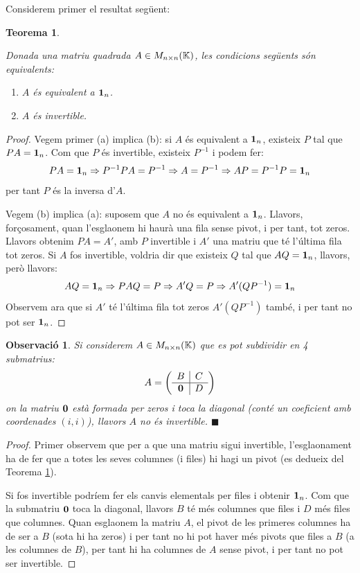 \documentclass[
  11pt,
]{book}
\numberwithin{dummy}{section}
\theoremstyle{maincolornumbox}
\newtheorem{theorem}{TTTT}[chapter]
\newtheorem{theoremeT}{Teorema}[chapter]
\newtheorem{remarkT}{Observació}[chapter]
\theoremstyle{blacknumex}
\theoremstyle{blacknumbox}
\theoremstyle{maincolornum}
\renewenvironment{theorem}{\begin{tBox}\begin{theoremeT}}{\end{theoremeT}\end{tBox}}
\newenvironment{remark}{\begin{remarkT}}{\hfill{\tiny\ensuremath{\blacksquare}}\end{remarkT}}
\begin{document}
Considerem primer el resultat següent:

\begin{theorem}
\protect\hypertarget{thm:critinv}{}\label{thm:critinv}

Donada una matriu quadrada
\(A \in M_{n\times n}(\mathbb{K})\), les condicions següents són equivalents:

\begin{enumerate}
\def\labelenumi{\arabic{enumi}.}
\item
  \(A\) és equivalent a \(\mathbf{1}_n\).
\item
  \(A\) és invertible.
\end{enumerate}

\end{theorem}

\begin{proof}
Vegem primer (a) implica (b): si \(A\) és equivalent a \(\mathbf{1}_n\),
existeix \(P\) tal que \(PA=\mathbf{1}_n\). Com que \(P\) és invertible, existeix
\(P^{-1}\) i podem fer:
\[PA=\mathbf{1}_n \Rightarrow P ^{-1}PA=P^{-1} \Rightarrow A=P^{-1} \Rightarrow AP = P^{-1}P=\mathbf{1}_n\]
per tant \(P\) és la inversa d'\(A\).

Vegem (b) implica (a): suposem que \(A\) no és equivalent a \(\mathbf{1}_n\).
Llavors, forçosament, quan l'esglaonem hi haurà una fila sense pivot, i
per tant, tot zeros. Llavors obtenim \(PA=A'\), amb \(P\) invertible i \(A'\)
una matriu que té l'última fila tot zeros. Si \(A\) fos invertible,
voldria dir que existeix \(Q\) tal que \(AQ=\mathbf{1}_n\), llavors, però llavors:
\[AQ=\mathbf{1}_n \Rightarrow PAQ=P \Rightarrow A'Q=P \Rightarrow A'(QP^{-1})=\mathbf{1}_n\]
Observem ara que si \(A'\) té l'última fila tot zeros \(A'(QP^{-1})\) també,
i per tant no pot ser \(\mathbf{1}_n\).
\end{proof}

\begin{remark}
Si considerem \(A \in M_{n\times n}(\mathbb{K})\)
que es pot subdividir en 4 submatrius: \[A=\left(\begin{array}{c|c}
    B & C \\ \hline \mathbf{0} & D
    \end{array}\right)\] on la matriu \(\mathbf{0}\) està formada per zeros i toca la
diagonal (conté un coeficient amb coordenades \((i,i)\)), llavors \(A\) no
és invertible.
\end{remark}

\begin{proof}
Primer observem que per a que una matriu sigui invertible,
l'esglaonament ha de fer que a totes les seves columnes (i files) hi
hagi un pivot (es dedueix del Teorema
\ref{thm:critinv}).

Si fos invertible podríem fer els canvis elementals per files i obtenir
\(\mathbf{1}_n\). Com que la submatriu \(\mathbf{0}\) toca la diagonal, llavors \(B\) té més
columnes que files i \(D\) més files que columnes. Quan esglaonem la
matriu \(A\), el pivot de les primeres columnes ha de ser a \(B\) (sota hi
ha zeros) i per tant no hi pot haver més pivots que files a \(B\) (a les
columnes de \(B\)), per tant hi ha columnes de \(A\) sense pivot, i per tant
no pot ser invertible.
\end{proof}
\end{document}
